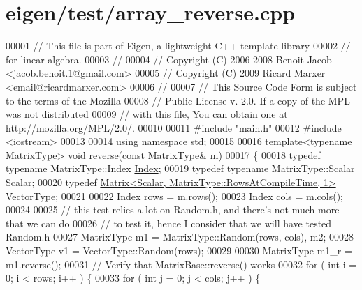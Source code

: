 \hypertarget{eigen_2test_2array__reverse_8cpp_source}{}\section{eigen/test/array\+\_\+reverse.cpp}
\label{eigen_2test_2array__reverse_8cpp_source}

\begin{DoxyCode}
00001 \textcolor{comment}{// This file is part of Eigen, a lightweight C++ template library}
00002 \textcolor{comment}{// for linear algebra.}
00003 \textcolor{comment}{//}
00004 \textcolor{comment}{// Copyright (C) 2006-2008 Benoit Jacob <jacob.benoit.1@gmail.com>}
00005 \textcolor{comment}{// Copyright (C) 2009 Ricard Marxer <email@ricardmarxer.com>}
00006 \textcolor{comment}{//}
00007 \textcolor{comment}{// This Source Code Form is subject to the terms of the Mozilla}
00008 \textcolor{comment}{// Public License v. 2.0. If a copy of the MPL was not distributed}
00009 \textcolor{comment}{// with this file, You can obtain one at http://mozilla.org/MPL/2.0/.}
00010 
00011 \textcolor{preprocessor}{#include "main.h"}
00012 \textcolor{preprocessor}{#include <iostream>}
00013 
00014 \textcolor{keyword}{using namespace }\hyperlink{namespacestd}{std};
00015 
00016 \textcolor{keyword}{template}<\textcolor{keyword}{typename} MatrixType> \textcolor{keywordtype}{void} reverse(\textcolor{keyword}{const} MatrixType& m)
00017 \{
00018   \textcolor{keyword}{typedef} \textcolor{keyword}{typename} MatrixType::Index \hyperlink{namespace_eigen_a62e77e0933482dafde8fe197d9a2cfde}{Index};
00019   \textcolor{keyword}{typedef} \textcolor{keyword}{typename} MatrixType::Scalar Scalar;
00020   \textcolor{keyword}{typedef} \hyperlink{group___core___module_class_eigen_1_1_matrix}{Matrix<Scalar, MatrixType::RowsAtCompileTime, 1>} 
      \hyperlink{struct_vector_type}{VectorType};
00021 
00022   Index rows = m.rows();
00023   Index cols = m.cols();
00024 
00025   \textcolor{comment}{// this test relies a lot on Random.h, and there's not much more that we can do}
00026   \textcolor{comment}{// to test it, hence I consider that we will have tested Random.h}
00027   MatrixType m1 = MatrixType::Random(rows, cols), m2;
00028   VectorType v1 = VectorType::Random(rows);
00029 
00030   MatrixType m1\_r = m1.reverse();
00031   \textcolor{comment}{// Verify that MatrixBase::reverse() works}
00032   \textcolor{keywordflow}{for} ( \textcolor{keywordtype}{int} i = 0; i < rows; i++ ) \{
00033     \textcolor{keywordflow}{for} ( \textcolor{keywordtype}{int} j = 0; j < cols; j++ ) \{

\end{DoxyCode}
